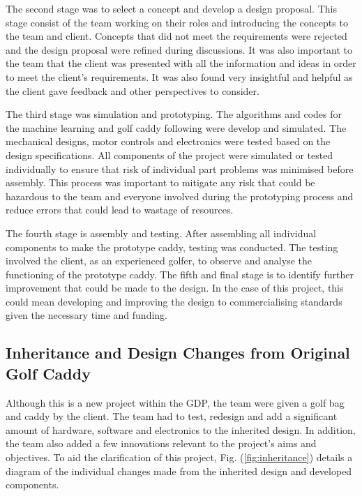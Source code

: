 \documentclass[11pt,landscape]{article}
\begin{document}
\begin{multicols}{2}
The second stage was to select a concept and develop a design proposal. This
stage consist of the team working on their roles and introducing the concepts to the
team and client. Concepts that did not meet the requirements were rejected and
the design proposal were refined during discussions. It was also important to
the team that the client was presented with all the information and ideas in
order to meet the client’s requirements. It was also found very insightful and
helpful as the client gave feedback and other perspectives to consider. 

The third stage was simulation and prototyping. The algorithms and codes for the
machine learning and golf caddy following were develop and simulated. The mechanical
designs, motor controls and electronics were tested based on the design
specifications. All components of the project were simulated or tested
individually to ensure that risk of individual part problems was minimised
before assembly. This process was important to mitigate any risk that could be
hazardous to the team and everyone involved during the prototyping process and
reduce errors that could lead to wastage of resources. 

The fourth stage is assembly and testing. After assembling all individual
components to make the prototype caddy, testing was conducted. The testing
involved the client, as an experienced golfer, to observe and analyse the
functioning of the prototype caddy. The fifth and
final stage is to identify further improvement that could be made to the design.
In the case of this project, this could mean developing and improving the design
to commercialising standards given the necessary time and funding. 

\subsection{Inheritance and Design Changes from Original Golf Caddy}
Although this is a new project within the GDP, the team were given a golf bag
and caddy by the client. The team had to test, redesign and add a significant
amount of hardware, software and electronics to the inherited design. In
addition, the team also added a few innovations relevant to the project’s
aims and objectives. To aid the clarification of this project, Fig.
(\ref{fig:inheritance}) details a diagram of the individual changes made
from the inherited design and developed components. 
\end{multicols}
\newpage
\end{document}
